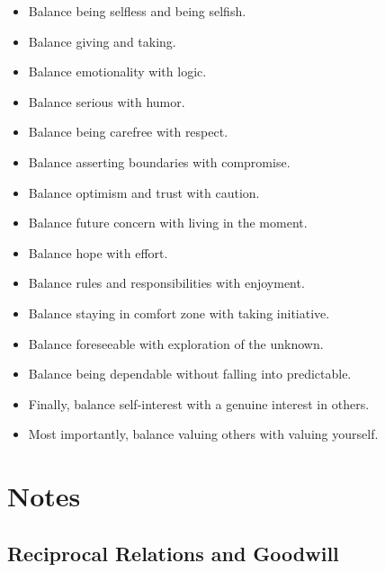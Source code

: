 \documentclass[
]{book}
\providecommand{\tightlist}{%
  \setlength{\itemsep}{0pt}\setlength{\parskip}{0pt}}
\begin{document}
\begin{itemize}
\tightlist
\item
  Balance being selfless and being selfish.
\item
  Balance giving and taking.
\item
  Balance emotionality with logic.
\item
  Balance serious with humor.
\item
  Balance being carefree with respect.
\item
  Balance asserting boundaries with compromise.
\item
  Balance optimism and trust with caution.
\item
  Balance future concern with living in the moment.
\item
  Balance hope with effort.
\item
  Balance rules and responsibilities with enjoyment.
\item
  Balance staying in comfort zone with taking initiative.
\item
  Balance foreseeable with exploration of the unknown.
\item
  Balance being dependable without falling into predictable.
\item
  Finally, balance self-interest with a genuine interest in others.
\item
  Most importantly, balance valuing others with valuing yourself.
\end{itemize}

\hypertarget{notes}{%
\section{Notes}\label{notes}}

\hypertarget{reciprocal-relations-and-goodwill}{%
\subsection{Reciprocal Relations and Goodwill}\label{reciprocal-relations-and-goodwill}}
\end{document}
